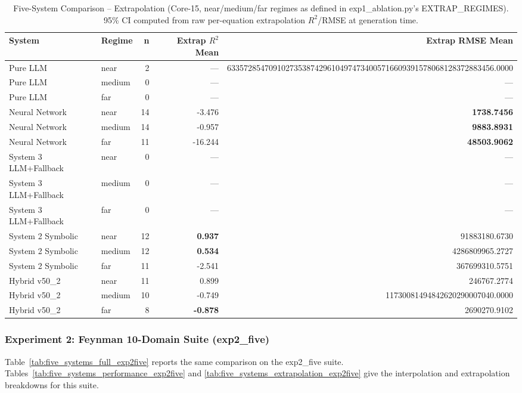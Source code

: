 \begin{table}[t]
\centering
\caption{Five-System Comparison -- Extrapolation (Core-15, near/medium/far
  regimes as defined in exp1\_ablation.py's EXTRAP\_REGIMES).
  95\% CI computed from raw per-equation extrapolation $R^2$/RMSE at
  generation time.}
\label{tab:five_systems_extrapolation}
\begin{tabular}{llrrr}
\toprule
\textbf{System} & \textbf{Regime} & \textbf{n}
  & \textbf{Extrap $R^2$ Mean} & \textbf{Extrap RMSE Mean} \\
\midrule
Pure LLM & near & 2 & --- & 6335728547091027353874296104974734005716609391578068128372883456.0000 \\
Pure LLM & medium & 0 & --- & --- \\
Pure LLM & far & 0 & --- & --- \\
Neural Network & near & 14 & -3.476 & \textbf{1738.7456} \\
Neural Network & medium & 14 & -0.957 & \textbf{9883.8931} \\
Neural Network & far & 11 & -16.244 & \textbf{48503.9062} \\
System 3 LLM+Fallback & near & 0 & --- & --- \\
System 3 LLM+Fallback & medium & 0 & --- & --- \\
System 3 LLM+Fallback & far & 0 & --- & --- \\
System 2 Symbolic & near & 12 & \textbf{0.937} & 91883180.6730 \\
System 2 Symbolic & medium & 12 & \textbf{0.534} & 4286809965.2727 \\
System 2 Symbolic & far & 11 & -2.541 & 367699310.5751 \\
Hybrid v50_2 & near & 11 & 0.899 & 246767.2774 \\
Hybrid v50_2 & medium & 10 & -0.749 & 11730081494842620290007040.0000 \\
Hybrid v50_2 & far & 8 & \textbf{-0.878} & 2690270.9102 \\
\bottomrule
\end{tabular}
\end{table}

\subsubsection{Experiment 2: Feynman 10-Domain Suite (exp2\_five)}\label{subsubsec:five-system-exp2}

Table~\ref{tab:five_systems_full_exp2five} reports the same
comparison on the exp2\_five suite. Tables~\ref{tab:five_systems_performance_exp2five}
and \ref{tab:five_systems_extrapolation_exp2five} give the interpolation and
extrapolation breakdowns for this suite.

